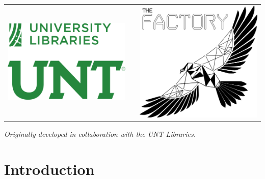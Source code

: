 \documentclass[12pt]{article}
\newcommand{\+}{\item}		%
\begin{document}
\begin{center}
\begin{tabular}{c p{1.0in} c}
\includegraphics[scale=0.25]{UNTLibLogoStacked.png} & & \includegraphics[scale=0.185]{FactoryBWlogotrimmed.png} \\
\end{tabular}

\emph{Originally developed in collaboration with the UNT Libraries.}
\end{center}

\newpage

\section{Introduction}
\end{document}
